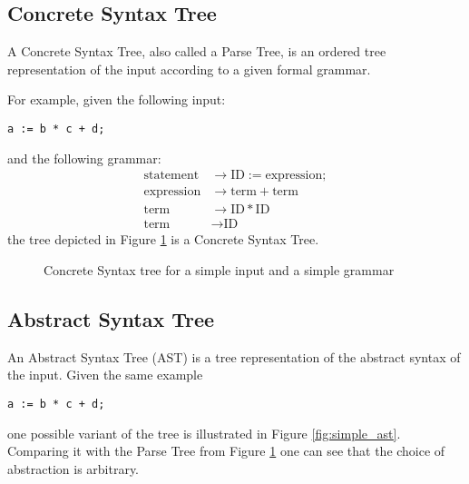 \subsection{Concrete Syntax Tree}

A Concrete Syntax Tree, also called a Parse Tree, is an ordered tree
representation of the input according to a given formal grammar.

For example, given the following input:
\begin{lstlisting}
a := b * c + d;
\end{lstlisting}
and the following grammar:
\begin{align*}
  \textrm{statement}  & \rightarrow \textrm{ID} := \textrm{expression} ; \\
  \textrm{expression} & \rightarrow \textrm{term} + \textrm{term} \\
  \textrm{term}       & \rightarrow \textrm{ID} * \textrm{ID} \\
  \textrm{term}       & \rightarrow \textrm{ID}
\end{align*}
the tree depicted in Figure \ref{fig:simple_cst} is a Concrete Syntax Tree.

\begin{figure}[hbt!]
  \centering
  \caption{Concrete Syntax tree for a simple input and a simple grammar}
  \label{fig:simple_cst}
\end{figure}

\subsection{Abstract Syntax Tree}

An Abstract Syntax Tree (AST) is a tree representation of the abstract
syntax of the input. Given the same example
\begin{lstlisting}
a := b * c + d;
\end{lstlisting}
one possible variant of the tree is illustrated in Figure
\ref{fig:simple_ast}. Comparing it with the Parse Tree from Figure
\ref{fig:simple_cst} one can see that the choice of abstraction is
arbitrary.

